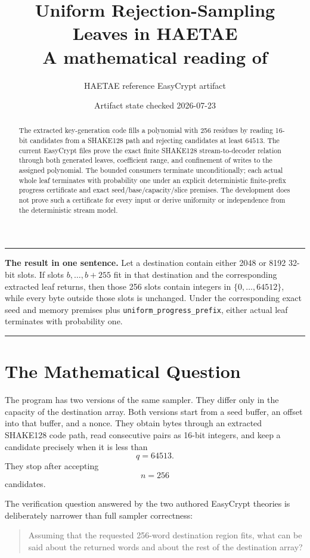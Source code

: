 \documentclass[11pt]{article}
\title{Uniform Rejection-Sampling Leaves in HAETAE\\
\large A mathematical reading of \code{TargetKeygenUniformXofLeaf.ec}}
\author{HAETAE reference EasyCrypt artifact}
\date{Artifact state checked 2026-07-23}
\theoremstyle{definition}
\theoremstyle{plain}
\theoremstyle{remark}
\newcommand{\code}[1]{\nolinkurl{#1}}
\newenvironment{resultbox}
  {\begin{center}\begin{minipage}{0.94\linewidth}\color{artifactgreen}\hrule\vspace{0.6em}\color{black}}
  {\vspace{0.6em}\color{artifactgreen}\hrule\end{minipage}\end{center}}
\begin{document}
\maketitle

\begin{abstract}
The extracted key-generation code fills a polynomial with 256 residues by
reading 16-bit candidates from a SHAKE128 path and rejecting candidates at
least $64513$.  The current EasyCrypt files prove the exact finite SHAKE128
stream-to-decoder relation through both generated leaves, coefficient range,
and confinement of writes to the assigned polynomial.  The bounded consumers
terminate unconditionally; each actual whole leaf terminates with probability
one under an explicit deterministic finite-prefix progress certificate and
exact seed/base/capacity/slice premises.  The development does not prove such
a certificate for every input or derive uniformity or independence from the
deterministic stream model.
\end{abstract}

\begin{resultbox}
\textbf{The result in one sentence.}
Let a destination contain either 2048 or 8192 32-bit slots.  If slots
$b,\ldots,b+255$ fit in that destination and the corresponding extracted leaf
returns, then those 256 slots contain integers in
$\{0,\ldots,64512\}$, while every byte outside those slots is unchanged.  Under
the corresponding exact seed and memory premises plus
\code{uniform_progress_prefix}, either actual leaf terminates with probability
one.
\end{resultbox}

\section{The Mathematical Question}

The program has two versions of the same sampler.  They differ only in the
capacity of the destination array.  Both versions start from a seed buffer,
an offset into that buffer, and a nonce.  They obtain bytes through an
extracted SHAKE128 code path, read consecutive pairs as 16-bit integers, and
keep a candidate precisely when it is less than
\[
  q=64513.
\]
They stop after accepting
\[
  n=256
\]
candidates.

The verification question answered by the two authored EasyCrypt theories is
deliberately narrower than full sampler correctness:

\begin{quote}
Assuming that the requested 256-word destination region fits, what can be
said about the returned words and about the rest of the destination array?
\end{quote}
\end{document}
